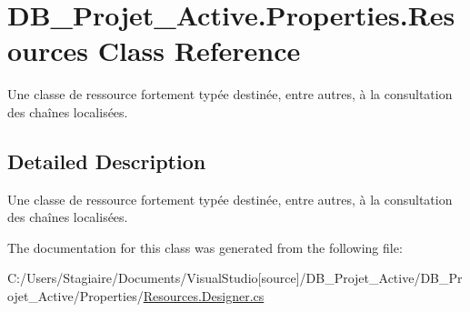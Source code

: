 \hypertarget{class_d_b___projet___active_1_1_properties_1_1_resources}{}\section{D\+B\+\_\+\+Projet\+\_\+\+Active.\+Properties.\+Resources Class Reference}
\label{class_d_b___projet___active_1_1_properties_1_1_resources}


Une classe de ressource fortement typée destinée, entre autres, à la consultation des chaînes localisées.  




\subsection{Detailed Description}
Une classe de ressource fortement typée destinée, entre autres, à la consultation des chaînes localisées. 



The documentation for this class was generated from the following file\+:\begin{DoxyCompactItemize}
\item 
C\+:/\+Users/\+Stagiaire/\+Documents/\+Visual\+Studio\mbox{[}source\mbox{]}/\+D\+B\+\_\+\+Projet\+\_\+\+Active/\+D\+B\+\_\+\+Projet\+\_\+\+Active/\+Properties/\mbox{\hyperlink{_resources_8_designer_8cs}{Resources.\+Designer.\+cs}}\end{DoxyCompactItemize}
